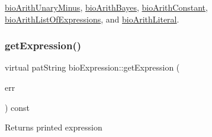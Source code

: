 \hyperlink{classbio_arith_unary_minus_aaf1b155993a12037850b1a22dbb36f7c}{bio\+Arith\+Unary\+Minus}, \hyperlink{classbio_arith_bayes_a53f5d22f6a5b743fbf50bd75db697ccd}{bio\+Arith\+Bayes}, \hyperlink{classbio_arith_constant_afbe5eaceb8943323f7bf0bfd3491b19a}{bio\+Arith\+Constant}, \hyperlink{classbio_arith_list_of_expressions_a14fe977b86bc69c4b3afe59d44b6c03f}{bio\+Arith\+List\+Of\+Expressions}, and \hyperlink{classbio_arith_literal_affebfbf01e421ec9cf55b4cf883039ce}{bio\+Arith\+Literal}.

\mbox{\label{classbio_expression_a66a83eb0caac18dd5e568ffde5a8b5d4}} 
\subsubsection{\texorpdfstring{get\+Expression()}{getExpression()}}
{\footnotesize\ttfamily virtual pat\+String bio\+Expression\+::get\+Expression (\begin{DoxyParamCaption}\item[{pat\+Error $\ast$\&}]{err }\end{DoxyParamCaption}) const\hspace{0.3cm}{\ttfamily [virtual]}}

\begin{DoxyReturn}{Returns}
printed expression 
\end{DoxyReturn}


